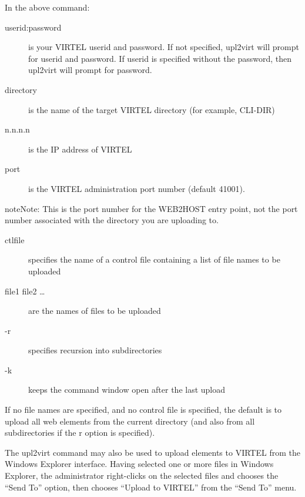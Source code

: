 \documentclass[letterpaper,10pt,english]{sphinxmanual}
\begin{document}
In the above command:
\begin{description}
\item[{userid:password}] \leavevmode
is your VIRTEL userid and password. If not specified, upl2virt will prompt for userid and password. If userid is specified without the password, then upl2virt will prompt for password.

\item[{directory}] \leavevmode
is the name of the target VIRTEL directory (for example, CLI-DIR)

\item[{n.n.n.n}] \leavevmode
is the IP address of VIRTEL

\item[{port}] \leavevmode
is the VIRTEL administration port number (default 41001).

\end{description}

\begin{sphinxadmonition}{note}{Note:}
This is the port number for the WEB2HOST entry point, not the port number associated with the directory you are uploading to.
\end{sphinxadmonition}
\begin{description}
\item[{ctlfile}] \leavevmode
specifies the name of a control file containing a list of file names to be uploaded

\item[{file1 file2 …}] \leavevmode
are the names of files to be uploaded

\item[{-r}] \leavevmode
specifies recursion into subdirectories

\item[{-k}] \leavevmode
keeps the command window open after the last upload

\end{description}

If no file names are specified, and no control file is specified, the default is to upload all web elements from the current directory (and also from all subdirectories if the \textendash{}r option is specified).


The upl2virt command may also be used to upload elements to VIRTEL from the Windows Explorer interface. Having selected one or more files in Windows Explorer, the administrator right-clicks on the selected files and chooses the “Send To” option, then chooses “Upload to VIRTEL” from the “Send To” menu.
\end{document}
